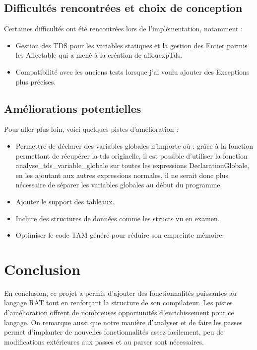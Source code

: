 \documentclass[a4paper,12pt]{article}
\begin{document}
\subsection{Difficult\'es rencontr\'ees et choix de conception}
Certaines difficult\'es ont \'et\'e rencontr\'ees lors de l'impl\'ementation, notamment :
\begin{itemize}
    \item Gestion des TDS pour les variables statiques et la gestion des Entier parmis les Affectable qui a mené à la création de affouexpTds.
    \item Compatibilit\'e avec les anciens tests lorsque j'ai voulu ajouter des Exceptions plus précises.
\end{itemize}

\subsection{Am\'eliorations potentielles}
Pour aller plus loin, voici quelques pistes d'am\'elioration :
\begin{itemize}
    \item Permettre de déclarer des variables globales n'importe où : grâce à la fonction permettant de récupérer la tds originelle, il est possible d'utiliser la fonction analyse\_tds\_variable\_globale sur toutes les expressions DeclarationGlobale, en les ajoutant aux autres expressions normales, il ne serait donc plus nécessaire de séparer les variables globales au début du programme.
    \item Ajouter le support des tableaux.
    \item Inclure des structures de donn\'ees comme les structs vu en examen.
    \item Optimiser le code TAM g\'en\'er\'e pour r\'eduire son empreinte m\'emoire.
\end{itemize}

\section{Conclusion}
En conclusion, ce projet a permis d'ajouter des fonctionnalit\'es puissantes au langage RAT tout en renfor\c{c}ant la structure de son compilateur. Les pistes d'am\'elioration offrent de nombreuses opportunit\'es d'enrichissement pour ce langage.
On remarque aussi que notre manière d'analyser et de faire les passes permet d'implanter de nouvelles fonctionnalités assez facilement, peu de modifications extérieures aux passes et au parser sont nécessaires. 
\end{document}
